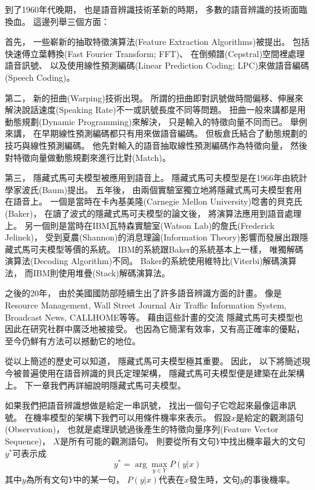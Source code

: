 到了1960年代晚期，
也是語音辨識技術革新的時期，
多數的語音辨識的技術面臨換血。
這邊列舉三個方面：

首先，
一些嶄新的抽取特徵演算法(Feature Extraction Algorithms)被提出。
包括快速傅立葉轉換(Fast Fourier Transform; FFT)、
在倒頻譜(Cepstral)空間裡處理語音訊號、
以及使用線性預測編碼(Linear Prediction Coding; LPC)來做語音編碼(Speech Coding)。

第二，
新的扭曲(Warping)技術出現。
所謂的扭曲即對訊號做時間偏移、伸展來解決說話速度(Speaking Rate)不一或訊號長度不同等問題。
扭曲一般來講都是用動態規劃(Dynamic Programming)來解決，
只是輸入的特徵向量不同而已。
舉例來講，
在早期線性預測編碼都只有用來做語音編碼。
但板倉氏結合了動態規劃的技巧與線性預測編碼。
他先對輸入的語音抽取線性預測編碼作為特徵向量，
然後對特徵向量做動態規劃來進行比對(Match)。

第三，
隱藏式馬可夫模型被應用到語音上。
隱藏式馬可夫模型是在1966年由統計學家波氏(Baum)提出\cite{BaumHMM}。
五年後，
由兩個實驗室獨立地將隱藏式馬可夫模型套用在語音上。
一個是當時在卡內基美隆(Carnegie Mellon University)唸書的貝克氏(Baker)，
在讀了波式的隱藏式馬可夫模型的論文後，
將演算法應用到語音處理上。
另一個則是當時在IBM瓦特森實驗室(Watson Lab)的詹氏(Frederick Jelinek)，
受到夏農(Shannon)的消息理論(Information Theory)影響而發展出跟隱藏式馬可夫模型等價的系統。
IBM的系統跟Baker的系統基本上一樣，
唯獨解碼演算法(Decoding Algorithm)不同。
Baker的系統使用維特比(Viterbi)解碼演算法，
而IBM則使用堆疊(Stack)解碼演算法。

之後的20年，
由於美國國防部陸續生出了許多語音辨識方面的計畫。
像是Resource Management, Wall Street Journal Air Traffic Information System, Broadcast News, CALLHOME等等。
藉由這些計畫的交流
隱藏式馬可夫模型也因此在研究社群中廣泛地被接受。
也因為它簡潔有效率，又有高正確率的優點，
至今仍鮮有方法可以撼動它的地位。

從以上簡述的歷史可以知道，
隱藏式馬可夫模型極其重要。
因此，
以下將簡述現今被普遍使用在語音辨識的貝氏定理架構，
隱藏式馬可夫模型便是建築在此架構上。
下一章我們再詳細說明隱藏式馬可夫模型。

如果我們把語音辨識想做是給定一串訊號，
找出一個句子它唸起來最像這串訊號。
在機率模型的架構下我們可以用條件機率來表示。
假設$x$是給定的觀測語句(Observation)，
也就是處理訊號過後產生的特徵向量序列(Feature Vector Sequence)，
$X$是所有可能的觀測語句。
則要從所有文句$Y$中找出機率最大的文句$y^{*}$可表示成
\begin{equation}
  y^{*} = \arg \max_{y \in Y} P(y | x)
\end{equation}
其中$y$為所有文句$Y$中的某一句，
$P(y | x)$代表在$x$發生時，文句$y$的事後機率。

